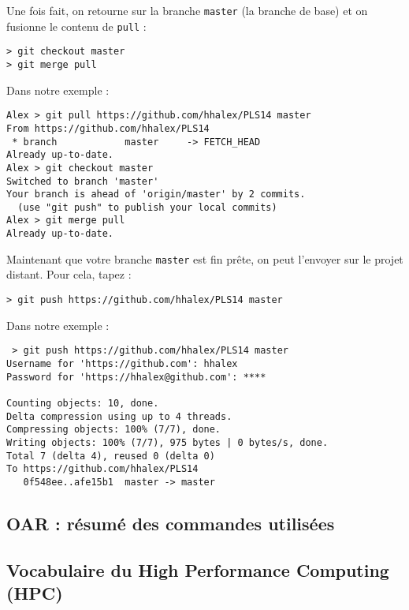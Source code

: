 \par Une fois fait, on retourne sur la branche \texttt{master} (la branche de base) et on fusionne le contenu de \texttt{pull} :

\begin{verbatim}
> git checkout master
> git merge pull
\end{verbatim}

\par Dans notre exemple :

\begin{verbatim}
Alex > git pull https://github.com/hhalex/PLS14 master
From https://github.com/hhalex/PLS14
 * branch            master     -> FETCH_HEAD
Already up-to-date.
Alex > git checkout master
Switched to branch 'master'
Your branch is ahead of 'origin/master' by 2 commits.
  (use "git push" to publish your local commits)
Alex > git merge pull
Already up-to-date.
\end{verbatim}

\par Maintenant que votre branche \texttt{master} est fin prête, on peut l'envoyer sur le projet distant. Pour cela, tapez :

\begin{verbatim}
> git push https://github.com/hhalex/PLS14 master
\end{verbatim}

\par Dans notre exemple :
\begin{verbatim}
 > git push https://github.com/hhalex/PLS14 master
Username for 'https://github.com': hhalex
Password for 'https://hhalex@github.com': ****

Counting objects: 10, done.
Delta compression using up to 4 threads.
Compressing objects: 100% (7/7), done.
Writing objects: 100% (7/7), 975 bytes | 0 bytes/s, done.
Total 7 (delta 4), reused 0 (delta 0)
To https://github.com/hhalex/PLS14
   0f548ee..afe15b1  master -> master
\end{verbatim}

\subsection{OAR : résumé des commandes utilisées}
\label{sec:oar-:-resume}

\subsection{Vocabulaire du High Performance Computing (HPC)}
\label{sec:vocab-spec-du}


